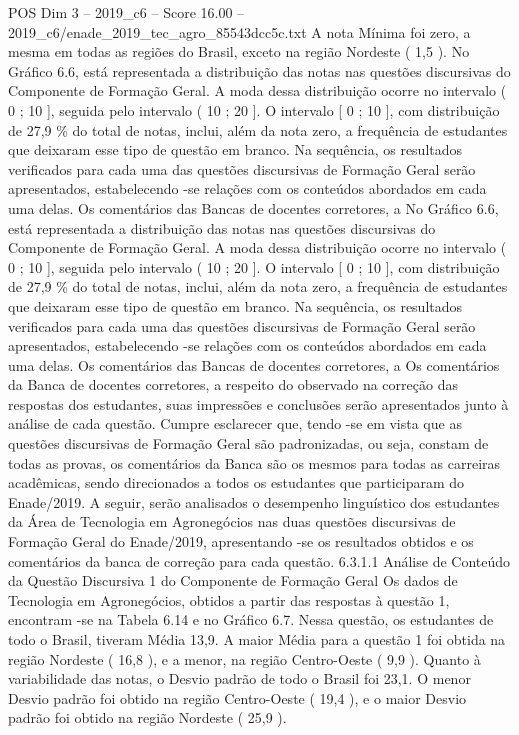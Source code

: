 \begin{textsample}{POS Dim 3 – 2019\_c6 – Score 16.00 – 2019\_c6/enade\_2019\_tec\_agro\_85543dcc5c.txt}
A nota Mínima foi zero, a mesma em todas as regiões do Brasil, exceto na região Nordeste ( 1,5 ).
No Gráfico 6.6, está representada a distribuição das notas nas questões discursivas do Componente de Formação Geral.
A moda dessa distribuição ocorre no intervalo ( 0 ; 10 ], seguida pelo intervalo ( 10 ; 20 ].
O intervalo [ 0 ; 10 ], com distribuição de 27,9 \% do total de notas, inclui, além da nota zero, a frequência de estudantes que deixaram esse tipo de questão em branco.
Na sequência, os resultados verificados para cada uma das questões discursivas de Formação Geral serão apresentados, estabelecendo -se relações com os conteúdos abordados em cada uma delas.
Os comentários das Bancas de docentes corretores, a No Gráfico 6.6, está representada a distribuição das notas nas questões discursivas do Componente de Formação Geral.
A moda dessa distribuição ocorre no intervalo ( 0 ; 10 ], seguida pelo intervalo ( 10 ; 20 ].
O intervalo [ 0 ; 10 ], com distribuição de 27,9 \% do total de notas, inclui, além da nota zero, a frequência de estudantes que deixaram esse tipo de questão em branco.
Na sequência, os resultados verificados para cada uma das questões discursivas de Formação Geral serão apresentados, estabelecendo -se relações com os conteúdos abordados em cada uma delas.
Os comentários das Bancas de docentes corretores, a Os comentários da Banca de docentes corretores, a respeito do observado na correção das respostas dos estudantes, suas impressões e conclusões serão apresentados junto à análise de cada questão.
Cumpre esclarecer que, tendo -se em vista que as questões discursivas de Formação Geral são padronizadas, ou seja, constam de todas as provas, os comentários da Banca são os mesmos para todas as carreiras acadêmicas, sendo direcionados a todos os estudantes que participaram do Enade/2019.
A seguir, serão analisados o desempenho linguístico dos estudantes da Área de Tecnologia em Agronegócios nas duas questões discursivas de Formação Geral do Enade/2019, apresentando -se os resultados obtidos e os comentários da banca de correção para cada questão. 6.3.1.1 Análise de Conteúdo da Questão Discursiva 1 do Componente de Formação Geral Os dados de Tecnologia em Agronegócios, obtidos a partir das respostas à questão 1, encontram -se na Tabela 6.14 e no Gráfico 6.7.
Nessa questão, os estudantes de todo o Brasil, tiveram Média 13,9.
A maior Média para a questão 1 foi obtida na região Nordeste ( 16,8 ), e a menor, na região Centro-Oeste ( 9,9 ).
Quanto à variabilidade das notas, o Desvio padrão de todo o Brasil foi 23,1.
O menor Desvio padrão foi obtido na região Centro-Oeste ( 19,4 ), e o maior Desvio padrão foi obtido na região Nordeste ( 25,9 ).

\end{textsample}
